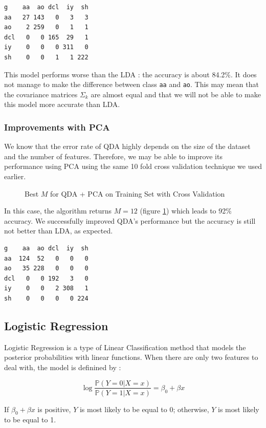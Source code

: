 \documentclass[]{report}
\newcommand{\inputtikz}[2]{%
	\scalebox{#1}{}  
}
\begin{document}
\begin{verbatim}
g    aa  ao dcl  iy  sh
aa   27 143   0   3   3
ao    2 259   0   1   1
dcl   0   0 165  29   1
iy    0   0   0 311   0
sh    0   0   1   1 222
\end{verbatim}

This model performs worse than the LDA : the accuracy is about 84.2\%. It does not manage to make the difference between class \texttt{aa} and \texttt{ao}. This may mean that the covariance matrices $\Sigma_k$ are almost equal and that we will not be able to make this model more accurate than LDA.

\subsubsection{Improvements with PCA}
We know that the error rate of QDA highly depends on the size of the dataset and the number of features. Therefore, we may be able to improve its performance using PCA using the same 10 fold cross validation technique we used earlier.

\begin{figure}[!hb]
	\centering
	\inputtikz{0.5}{Figures/qda_pca_cv.tex}
	\caption{Best $M$ for QDA + PCA on Training Set with Cross Validation}
	\label{fig:qda_pca_cv}
\end{figure}

In this case, the algorithm returns $M = 12$ (figure \ref{fig:qda_pca_cv}) which leads to 92\% accuracy. We successfully improved QDA's performance but the accuracy is still not better than LDA, as expected.

\begin{verbatim}
g    aa  ao dcl  iy  sh
aa  124  52   0   0   0
ao   35 228   0   0   0
dcl   0   0 192   3   0
iy    0   0   2 308   1
sh    0   0   0   0 224
\end{verbatim}

\subsection{Logistic Regression}

Logistic Regression is a type of Linear Classification method that models the posterior probabilities with linear functions. When there are only two features to deal with, the model is definined by : 

$$
\log \frac{\mathbb{P}(Y = 0 | X = x)}{\mathbb{P}(Y = 1 | X = x)} = \beta_0 + \beta x
$$

If $\beta_0 + \beta x$ is positive, $Y$ is most likely to be equal to 0; otherwise, $Y$ is most likely to be equal to 1.  \\
\end{document}
